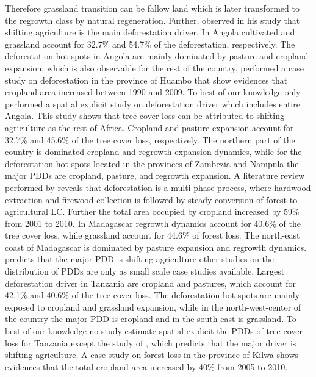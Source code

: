 Therefore grassland transition can be fallow land which is later transformed to the regrowth class by natural regeneration. Further, \citeauthor{Curtis2018} observed in his study that shifting agriculture is the main deforestation driver. In Angola cultivated and grassland account for 32.7\% and 54.7\% of the deforestation, respectively. The deforestation hot-spots in Angola are mainly dominated by pasture and cropland expansion, which is also observable for the rest of the country. \citet{Cabral2011} performed a case study on deforestation in the province of Huambo that show evidences that cropland area increased between 1990 and 2009. To best of our knowledge only \citet{Curtis2018} performed a spatial explicit study on deforestation driver which includes entire Angola. This study shows that tree cover loss can be attributed to shifting agriculture as the rest of Africa. Cropland and pasture expansion account for 32.7\% and 45.6\% of the tree cover loss, respectively. The northern part of the country is dominated cropland and regrowth expansion dynamics, while for the deforestation hot-spots located in the provinces of Zambezia and Nampula the major \acp{PDD} are cropland, pasture, and regrowth expansion. A literature review performed by \citet{Sitoe2012} reveals that deforestation is a multi-phase process, where hardwood extraction and firewood collection is followed by steady conversion of forest to agricultural \ac{LC}. Further the total area occupied by cropland increased by 59\% from 2001 to 2010. In Madagascar regrowth dynamics account for 40.6\% of the tree cover loss, while grassland account for 44.6\% of forest loss. The north-east coast of Madagascar is dominated by pasture expansion and regrowth dynamics. \citet{Curtis2018} predicts that the major \ac{PDD} is shifting agriculture other studies on the distribution of \acp{PDD} are only as small scale case studies available. Largest deforestation driver in Tanzania are cropland and pastures, which account for 42.1\% and 40.6\% of the tree cover loss. The deforestation hot-spots are mainly exposed to cropland and grassland expansion, while in the north-west-center of the country the major \ac{PDD} is cropland and in the south-east is grassland. To best of our knowledge no study estimate spatial explicit the \acp{PDD} of tree cover loss for Tanzania except the study of \citet{Curtis2018}, which predicts that the major driver is shifting agriculture. A case study on forest loss in the province of Kilwa shows evidences that the total cropland area increased by 40\% from 2005 to 2010.
